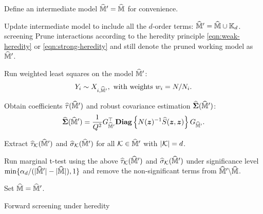 \documentclass[12pt]{article}
\begin{document}
\begin{algorithm}[!ht]
\DontPrintSemicolon
{}                %


    
    Define an intermediate model $\widehat{{\mathbb{M}}}' = \widehat{{\mathbb{M}}}$ for convenience.
    
    {
      Update intermediate model to include all the $d$-order terms: $\widehat{{\mathbb{M}}}' = \widehat{{\mathbb{M}}} \cup {\mathbb{K}}_d$.\label{alg:step-add-d-way} 
         screening
      Prune interactions according to the heredity principle \eqref{eqn:weak-heredity} or \eqref{eqn:strong-heredity} and still denote the pruned working model as $\widehat{{\mathbb{M}}}'$.  \label{alg:step-prune}      
      
      Run weighted least squares on the model $\widehat{{\mathbb{M}}}'$:
       \begin{align*}
          Y_i \sim X_{i, \widehat{{\mathbb{M}}}'}, \text{ with weights } w_i = N/N_i.
       \end{align*}
    
     
      Obtain coefficients $\widehat{\tau}(\widehat{{\mathbb{M}}}')$ and robust covariance estimation $\widehat{{\boldsymbol{\Sigma}}}(\widehat{{\mathbb{M}}}')$:
      \begin{align*}
          \widehat{{\boldsymbol{\Sigma}}}(\widehat{{\mathbb{M}}}') = \frac{1}{Q^2}G_{\widehat{{\mathbb{M}}}'}^\top \text{\bfseries Diag}\left\{N({\boldsymbol{z}})^{-1}{\widehat{S}}({\boldsymbol{z}},{\boldsymbol{z}})\right\} G_{\widehat{{\mathbb{M}}}'}.
      \end{align*} \label{alg:BC-1}
      

       Extract $\widehat{\tau}_{{\mathcal{K}}}(\widehat{{\mathbb{M}}}')$ and $\widehat{\sigma}_{\mathcal{K}}(\widehat{{\mathbb{M}}}')$ for all ${\mathcal{K}}\in\widehat{{\mathbb{M}}}'$ with $|{\mathcal{K}}| = d$. \label{alg:BC-2}

      Run marginal t-test using the above $\widehat{\tau}_{{\mathcal{K}}}(\widehat{{\mathbb{M}}}')$ and $\widehat{\sigma}_{\mathcal{K}}(\widehat{{\mathbb{M}}}')$  under significance level $\min\{\alpha_d/(|\widehat{{\mathbb{M}}}'|-|\widehat{{\mathbb{M}}}|),1\}$ and remove the non-significant terms from $\widehat{{\mathbb{M}}}'\backslash\widehat{{\mathbb{M}}}$.  \label{alg:BC-3}

      Set $\widehat{{\mathbb{M}}} = \widehat{{\mathbb{M}}}'$.
         
    }
    
    
    \KwRet{$\hat{\bbM}$}
    
\caption{Forward  screening under heredity}
\label{alg:forward-ms}
\end{algorithm}
\end{document}
